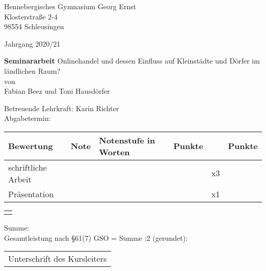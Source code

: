 \begin{titlepage}
    
    \raggedright
        Hennebergisches Gymnasium Georg Ernst\\
        Klosterstraße 2-4\\
        98554 Schleusingen
        
    \raggedleft\vspace*{-1.9cm}
        Jahrgang 2020/21
            \vfill\vfill\vfill\vfill\vfill\vfill

    \centering
        \LARGE\textbf{Seminararbeit} %
            \vfill
        \large Onlinehandel und dessen Einfluss auf Kleinstädte und Dörfer im ländlichen Raum?\\[\baselineskip]
        von\\
        Fabian Beez und Toni Hausdörfer
            \vfill\vfill\vfill\vfill

    \raggedright
        Betreuende Lehrkraft: \hfill Karin Richter\\
        Abgabetermin:\\[\baselineskip]
        \begin{tabular}[h]{|l|l|l|l|l|l|}
            \hline
            Bewertung & Note & Notenstufe in Worten & Punkte &  & Punkte \\
            \hline
            schriftliche Arbeit & & & & x3 & \\
            \hline
            Präsentation & & & & x1 & \\
            \hline
        \end{tabular}

    \raggedleft\vspace*{-0.05cm}
        \begin{tabular}[h]{|p{1.56cm}|}
            \hline
            \\
            \hline
            \\
            \hline
        \end{tabular}

    \raggedright\vspace*{-1.4cm}
        \hspace*{0.2cm}Summe: \hfill\\
        \hspace*{0.2cm}Gesamtleistung nach §61(7) GSO = Summe :2 (gerundet): \hfill\\[\baselineskip]
            \vfill\vfill\vfill
        
    \raggedleft
        \begin{tabular}{@{}l@{}}\hline
            Unterschrift des Kursleiters
        \end{tabular}
            \vfill\vfill
\end{titlepage}

\newpage
